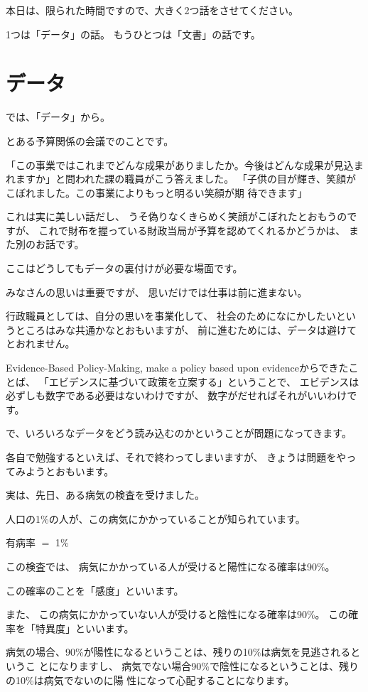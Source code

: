 \documentclass[uplatex,jis2004,dvipdfmx,12pt]{jsarticle}
\begin{document}
本日は、限られた時間ですので、大きく2つ話をさせてください。

1つは「データ」の話。
もうひとつは「文書」の話です。


\section{データ}
では、「データ」から。

とある予算関係の会議でのことです。

「この事業ではこれまでどんな成果がありましたか。今後はどんな成果が見込ま
れますか」と問われた課の職員がこう答えました。
「子供の目が輝き、笑顔がこぼれました。この事業によりもっと明るい笑顔が期
待できます」

これは実に美しい話だし、
うそ偽りなくきらめく笑顔がこぼれたとおもうのですが、
これで財布を握っている財政当局が予算を認めてくれるかどうかは、
また別のお話です。

ここはどうしてもデータの裏付けが必要な場面です。

みなさんの思いは重要ですが、
思いだけでは仕事は前に進まない。

行政職員としては、自分の思いを事業化して、
社会のためになにかしたいというところはみな共通かなとおもいますが、
前に進むためには、データは避けてとおれません。

Evidence-Based Policy-Making,
make a policy based upon evidenceからできたことば、
「エビデンスに基づいて政策を立案する」ということで、
エビデンスは必ずしも数字である必要はないわけですが、
数字がだせればそれがいいわけです。

で、いろいろなデータをどう読み込むのかということが問題になってきます。

各自で勉強するといえば、それで終わってしまいますが、
きょうは問題をやってみようとおもいます。

実は、先日、ある病気の検査を受けました。

人口の1\%の人が、この病気にかかっていることが知られています。

有病率 $=$ 1\%



この検査では、
病気にかかっている人が受けると陽性になる確率は90\%。

この確率のことを「感度」といいます。

また、
この病気にかかっていない人が受けると陰性になる確率は90\%。
この確率を「特異度」といいます。

病気の場合、90\%が陽性になるということは、残りの10\%は病気を見逃されるというこ
とになりますし、
病気でない場合90\%で陰性になるということは、残りの10\%は病気でないのに陽
性になって心配することになります。
\end{document}
